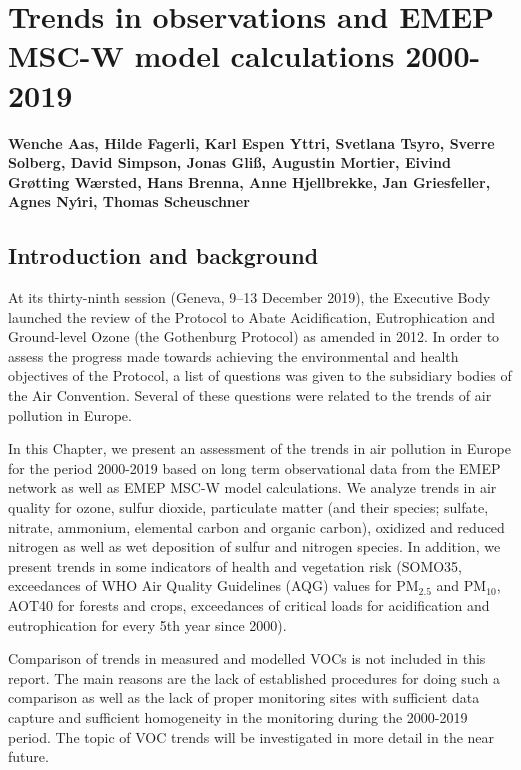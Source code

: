 \chapter[Trends]{Trends in observations and EMEP MSC-W model calculations 2000-2019}
\label{ch:Trends}

{\bf{Wenche Aas, Hilde Fagerli, Karl Espen Yttri, Svetlana Tsyro, Sverre Solberg, David Simpson, Jonas Gli{\ss}, Augustin Mortier, Eivind Grøtting Wærsted, Hans Brenna, Anne Hjellbrekke, Jan Griesfeller, Agnes Ny\'{\i}ri, Thomas Scheuschner}}\\



\section{\label{sec:Trends_introduction}Introduction and background}

At its thirty-ninth session (Geneva, 9–13 December 2019), the Executive Body launched the review of the Protocol to Abate Acidification, Eutrophication and Ground-level Ozone (the Gothenburg Protocol) as amended in 2012. In order to assess the progress made towards achieving the environmental and health objectives of the Protocol, a
list of questions was given to the subsidiary bodies of the Air Convention. Several of these questions were related to the trends of air pollution in Europe. 

In this Chapter, we present an assessment of the trends in air pollution in Europe for the period 2000-2019 based on long term observational data from the EMEP network as well as EMEP MSC-W model calculations. We analyze trends in air quality for ozone, sulfur dioxide, particulate matter (and their species; sulfate, nitrate, ammonium, elemental carbon and organic carbon), oxidized and reduced nitrogen as well as wet deposition of sulfur and nitrogen species. In addition, we present trends in some indicators of health and vegetation risk (SOMO35, exceedances of WHO Air Quality Guidelines (AQG) values for PM$_{2.5}$ and PM$_{10}$, AOT40 for forests and crops, exceedances of critical loads for acidification and eutrophication for every 5th year since 2000).

Comparison of trends in measured and modelled VOCs is not included in this report. The main reasons are the lack of established procedures for doing such a comparison as well as the lack of proper monitoring sites with sufficient data capture and sufficient homogeneity in the monitoring during the 2000-2019 period. The topic of VOC trends will be investigated in more detail in the near future. 

